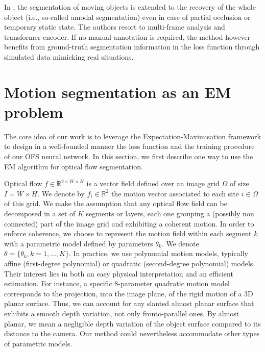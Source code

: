 \documentclass[10pt,twocolumn,letterpaper]{article}
\begin{document}
In \cite{lamdouar_bmvc_2021}, the segmentation of moving objects is extended to the recovery of the whole object (i.e., so-called amodal segmentation) even in case of partial occlusion or temporary static state. The authors resort to multi-frame analysis and transformer encoder. If no manual annotation is required, {\color{black} the method however benefits from ground-truth segmentation information in the loss function through simulated data mimicking real situations.}





\section{Motion segmentation as an EM problem}
\label{EM-segmentation}
The core idea of our work is to leverage the Expectation-Maximisation framework to design in a well-founded manner the loss function and the training procedure of our OFS neural network. In this section, we first describe one way to use the EM algorithm for optical flow segmentation. 

Optical flow $f \in \mathbb R^{2 \times W \times H}$ is a vector field defined over an image grid $\Omega$ of size $I = W \times H$. We denote by $f_i \in \mathbb R^2$ the motion vector associated to each site $i \in \Omega$ of this grid. We make the assumption that any optical flow field can be decomposed in a set of $K$ segments or layers, each one grouping a (possibly non connected) part of the image grid and exhibiting a coherent motion. In order to enforce coherence, we choose to represent the motion field within each segment $k$ with a parametric model defined by parameters $\theta_k$. We denote $\theta = \{\theta_k, k=1,\ldots,K\}$. In practice, we use polynomial motion models, typically affine (first-degree polynomial) or quadratic (second-degree polynomial) models. Their interest lies in both an easy physical interpretation and an efficient estimation. For instance, a specific 8-parameter quadratic motion model corresponds to the projection, into the image plane, of the rigid motion of a 3D planar surface. {\color{black} Thus, we can account for any slanted almost planar surface that exhibits a smooth depth variation, not only fronto-parallel ones. By almost planar, we mean a negligible depth variation of the object surface compared to its distance to the camera.} Our method could nevertheless accommodate other types of parametric models.
\end{document}
